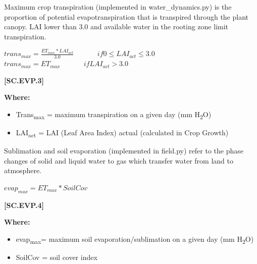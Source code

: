 Maximum crop transpiration (implemented in water\_dynamics.py) is the proportion of potential evapotranspiration that is transpired through the plant canopy. LAI lower than 3.0 and available water in the rooting zone limit transpiration.

    \begin{center}
 \( trans_{max}=\frac{ET_{max} * LAI_{act}}{3.0}	\ \ \ \ \ \ \ \ \ \ \ \ \ \ \ if 0 \leq LAI_{act} \leq 3.0 \) \\
  \(trans_{max}=ET_{max}	\ \ \ \ \ \ \ \ \ \ \ \ \ \ \ if LAI_{act} > 3.0\)
    \end{center}
        \vspace{0.5cm} 
    
            {\raggedleft \textbf{[SC.EVP.3]}\par}
            \vspace{0.5cm}

        \textbf{Where:}
            
        \begin{itemize}
            \item Trans\textsubscript{max}	=	maximum transpiration on a given day (mm H\textsubscript{2}O)
            \item LAI\textsubscript{act}		=	LAI (Leaf Area Index) actual (calculated in Crop Growth)
        \end{itemize}
\vspace{0.2cm}


Sublimation and soil evaporation (implemented in field.py) refer to the phase changes of solid and liquid water to gas which transfer water from land to atmosphere.

    \begin{center}
 \( evap_{max}=ET_{max} * SoilCov\)
    \end{center}
        \vspace{0.5cm} 
    
            {\raggedleft \textbf{[SC.EVP.4]}\par}
            \vspace{0.5cm}

        \textbf{Where:}
            
        \begin{itemize}
            \item evap\textsubscript{max}=	maximum soil evaporation/sublimation on a given day (mm H\textsubscript{2}O)
            \item SoilCov	=	soil cover index
        \end{itemize}
    \vspace{0.2cm}


